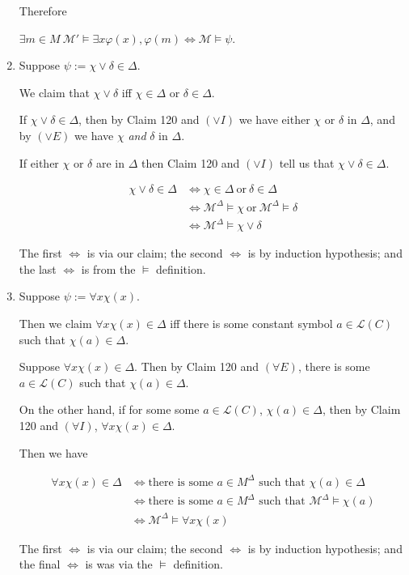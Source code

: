 \documentclass[a4paper]{article}
\newcommand{\MODEL}{\mathcal{M}}
\newcommand{\LANGUAGE}{\mathcal{L}}
\begin{document}
\begin{enumerate}
    Therefore
    
        $\exists m \in M\ \MODEL' \models \exists x \varphi (x), \varphi (m)\Leftrightarrow \MODEL \models \psi$.

    \item Suppose $\psi := \chi \vee \delta \in \Delta$. 
    
    We claim that $\chi \vee \delta$ iff $\chi \in \Delta$ or $\delta \in \Delta$. 
    
    If $\chi \vee \delta \in \Delta$, then by Claim 120 and $(\vee I)$ we have either $\chi$ or $\delta$ in $\Delta$, and by $(\vee E)$ we have $\chi$ \textit{and} $\delta$ in $\Delta$. 
    
    If either $\chi$ or $\delta$ are in $\Delta$ then Claim 120 and $(\vee I)$ tell us that $\chi \vee \delta \in \Delta$.


    \begin{align*}
        \chi \vee \delta \in \Delta & \Leftrightarrow  \chi \in \Delta\ \text{or} \ \delta \in \Delta\\
        & \Leftrightarrow \MODEL^{\Delta} \models \chi\ \text{or} \ \MODEL^{\Delta} \models \delta\\
        & \Leftrightarrow \MODEL^{\Delta} \models \chi \vee \delta
    \end{align*}

    The first $\Leftrightarrow$ is via our claim; the second $\Leftrightarrow$ is by induction hypothesis; and the last $\Leftrightarrow$ is from the $\models$ definition.

    \item Suppose $\psi := \forall x \chi (x)$. 
    
        Then we claim $\forall x \chi (x) \in \Delta$ iff there is some constant symbol $a \in \LANGUAGE (C)$ such that $\chi(a) \in \Delta$.

        Suppose $\forall x \chi (x) \in \Delta$. Then by Claim 120 and $(\forall E)$, there is some $a \in \LANGUAGE (C)$ such that $\chi(a) \in \Delta$.


        On the other hand, if for some some $a \in \LANGUAGE(C)$, $\chi (a) \in \Delta$, then by Claim 120 and $(\forall I)$, $\forall x \chi (x) \in \Delta$. 

        Then we have

    \begin{align*}
        \forall x \chi (x)\in \Delta & \Leftrightarrow \text{there is some } a \in M^{\Delta} \text{ such that } \chi(a) \in \Delta\\
        & \Leftrightarrow \text{there is some } a \in M^{\Delta} \text{ such that } \MODEL^{\Delta} \models \chi (a)\\
        & \Leftrightarrow \MODEL^{\Delta} \models \forall x \chi (x)
    \end{align*}

    The first $\Leftrightarrow$ is via our claim; the second $\Leftrightarrow$ is by induction hypothesis; and the final $\Leftrightarrow$ is was via the $\models$ definition.

\end{enumerate}
\end{document}
